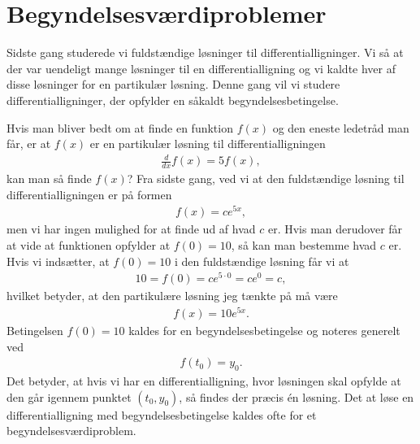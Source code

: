 \section{Begyndelsesværdiproblemer}
\noindent Sidste gang studerede vi fuldstændige løsninger til differentialligninger. Vi så at der var uendeligt mange løsninger til en differentialligning og vi kaldte hver af disse løsninger for en partikulær løsning. Denne gang vil vi studere differentialligninger, der opfylder en såkaldt begyndelsesbetingelse. 

Hvis man bliver bedt om at finde en funktion $f(x)$ og den eneste ledetråd man får, er at $f(x)$ er en partikulær løsning til differentialligningen
\begin{align*}
\frac{d}{dx}f(x)=5f(x),
\end{align*}
kan man så finde $f(x)$? Fra sidste gang, ved vi at den fuldstændige løsning til differentialligningen er på formen 
\begin{align*}
f(x)=ce^{5x},
\end{align*}
men vi har ingen mulighed for at finde ud af hvad $c$ er. Hvis man derudover får at vide at funktionen opfylder at $f(0)=10$, så kan man bestemme hvad $c$ er. Hvis vi indsætter, at $f(0)=10$ i den fuldstændige løsning får vi at
\begin{align*}
10=f(0)=ce^{5\cdot 0} = c e^0 = c,
\end{align*}
hvilket betyder, at den partikulære løsning jeg tænkte på må være
\begin{align*}
f(x)=10e^{5x}.
\end{align*}
Betingelsen $f(0)=10$ kaldes for en begyndelsesbetingelse og noteres generelt ved
\begin{align*}
f(t_0)=y_0.
\end{align*}
Det betyder, at hvis vi har en differentialligning, hvor løsningen skal opfylde at den går igennem punktet $(t_0,y_0)$, så findes der præcis én løsning. Det at løse en differentialligning med begyndelsesbetingelse kaldes ofte for et begyndelsesværdiproblem.

